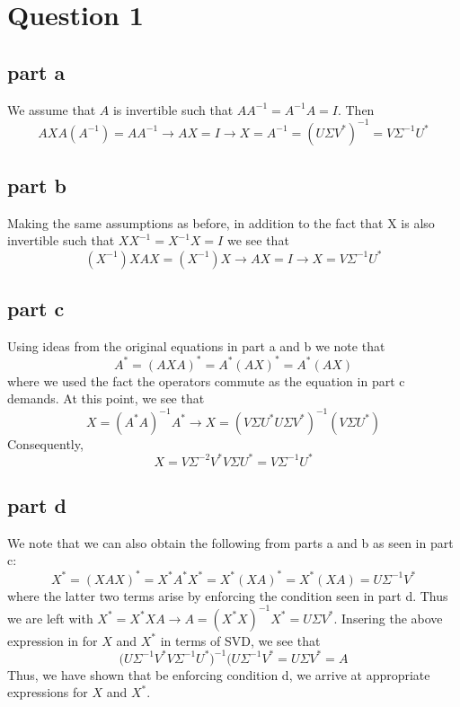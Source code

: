 \documentclass[a4paper,12pt]{article}
\begin{document}
\section{Question 1}
\subsection{part a}
We assume that $A$ is invertible such that $AA^{-1}=A^{-1}A=I$. Then
\begin{equation}
AXA(A^{-1})=AA^{-1} \rightarrow AX=I \rightarrow X=A^{-1}=(U\Sigma V^*)^{-1} = V \Sigma^{-1} U^*
\end{equation}
\subsection{part b}
Making the same assumptions as before, in addition to the fact that X is also invertible such that $ XX^{-1}=X^{-1}X=I $ we see that
\begin{equation}
(X^{-1})XAX=(X^{-1})X\rightarrow AX=I \rightarrow X=V\Sigma^{-1}U^*
\end{equation}

\subsection{part c}
Using ideas from the original equations in part a and b we note that
\begin{equation}
A^*=(AXA)^* = A^* (AX)^* = A^* (AX)
\end{equation} where we used the fact the operators commute as the equation in part c demands. At this point, we see that
\begin{equation}
X=(A^* A)^{-1} A^* \rightarrow X=(V\Sigma U^* U \Sigma V^*)^{-1} (V\Sigma U^*)
\end{equation} Consequently,
\begin{equation}
X=V \Sigma^{-2} V^* V \Sigma U^* = V\Sigma^{-1}U^*
\end{equation}

\subsection{part d}
We note that we can also obtain the following from parts a and b as seen in part c:
\begin{equation}
X^* = (XAX)^* = X^* A^* X^* = X^* (XA)^* =X^* (XA) = U\Sigma^{-1}V^*
\end{equation} where the latter two terms arise by enforcing the condition seen in part d. Thus we are left with $X^*=X^*XA\rightarrow A=(X^*X)^{-1}X^* = U\Sigma V^*$. Insering the above expression in for $X$ and $X^*$ in terms of SVD, we see that
\begin{equation}
\bigg( U\Sigma^{-1}V^* V \Sigma^{-1} U^* \bigg)^{-1}(U\Sigma^{-1}V^*=U\Sigma V^* =A
\end{equation}
Thus, we have shown that be enforcing condition d, we arrive at appropriate expressions for $X$ and $X^*$.
\end{document}
